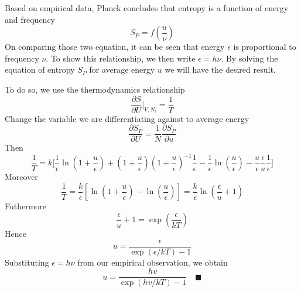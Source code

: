 \documentclass[../../../Main.tex]{subfiles}
\begin{document}
Based on empirical data, Planck concludes that entropy is a function of energy and frequency
\begin{equation*}
    S_P=f\left(\frac{u}{\nu}\right)
\end{equation*}
On comparing those two equation, it can be seen that energy $\epsilon$ is proportional to frequency $\nu$. To show this relationship, we then write $\epsilon=h\nu$. By solving the equation of entropy $S_P$ for average energy $u$ we will have the desired result.

To do so, we use the thermodynamics relationship
\begin{equation*}
    \frac{\partial S}{\partial U}\bigg|_{V, N_i}=\frac{1}{T}
\end{equation*}
Change the variable we are differentiating against to average energy 
\begin{equation*}
    \frac{\partial S_P}{\partial U}=\frac{1}{N}\frac{\partial S_P}{\partial u}
\end{equation*}
Then 
\begin{equation*}
    \frac{1}{T}=k\bigg[ \frac{1}{\epsilon}\ln\left(1+\frac{u}{\epsilon}\right) +\left(1+\frac{u}{\epsilon}\right) \left(1+\frac{u}{\epsilon}\right)^{-1 }\frac{1}{\epsilon} -\frac{1}{\epsilon}\ln\left(\frac{u}{\epsilon}\right) -\frac{u}{\epsilon}\frac{\epsilon}{u}\frac{1}{\epsilon}\bigg]
\end{equation*}
Moreover
\begin{equation*}
    \frac{1}{T}=\frac{k}{\epsilon}\left[\ln\left(1+\frac{u}{\epsilon}\right)-\ln \left(\frac{u}{\epsilon}\right)\right]=\frac{k}{\epsilon}\ln \left(\frac{\epsilon}{u}+1\right)
\end{equation*}
Futhermore
\begin{equation*}
    \frac{\epsilon}{u}+1=\exp \left(\frac{\epsilon}{kT}\right)
\end{equation*}
Hence
\begin{equation*}
    u=\frac{\epsilon}{\exp(\epsilon/k T)-1}
\end{equation*}
Substituting $\epsilon=h\nu$ from our empirical observation, we obtain
\begin{equation*}
    u=\frac{hv}{\exp(hv/k T)-1}\quad\blacksquare
\end{equation*}
\end{document}
